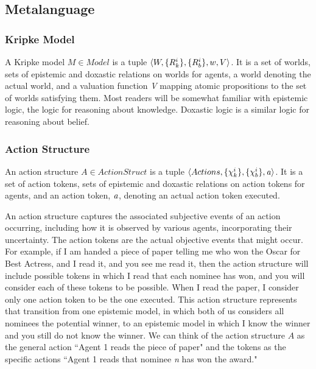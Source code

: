 \subsection{Metalanguage}
\subsubsection{Kripke Model}%
A Kripke model $M\in Model$ is a tuple $\langle W, \{R_{k}^i\}, \{R_{b}^i\}, w, V \rangle$. It is a set of worlds, sets of epistemic and doxastic relations on worlds for agents, a world denoting the actual world, and a valuation function \emph{V} mapping atomic propositions to the set of worlds satisfying them. Most readers will be somewhat familiar with epistemic logic, the logic for reasoning about knowledge. Doxastic logic is a similar logic for reasoning about belief\cite{Hintikka}.

\subsubsection{Action Structure}
An action structure $A\in ActionStruct$ is a tuple $\langle Actions,\\\{\chi_{k}^i\}, \{\chi_{b}^i\}, \mathit{a} \rangle$. It is a set of action tokens, sets of epistemic and doxastic relations on action tokens for agents, and an action token, $\mathit{a}$, denoting an actual action token executed. 

An action structure captures the associated subjective events of an action occurring, including how it is observed by various agents, incorporating their uncertainty. The action tokens are the actual objective events that might occur. For example, if I am handed a piece of paper telling me who won the Oscar for Best Actress, and I read it, and you see me read it, then the action structure will include possible tokens in which I read that each nominee has won, and you will consider each of these tokens to be possible. When I read the paper, I consider only one action token to be the one executed. This action structure represents that transition from one epistemic model, in which both of us considers all nominees the potential winner, to an epistemic model in which I know the winner and you still do not know the winner. We can think of the action structure $A$ as the general action ``Agent 1 reads the piece of paper" and the tokens as the specific actions ``Agent 1 reads that nominee \emph{n} has won the award."


